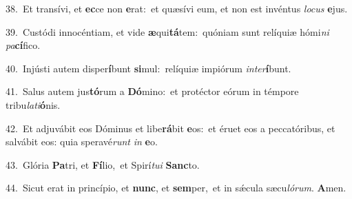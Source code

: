 {\numbfont\textcolor{\numbcolor}{38.}}~Et transívi, et \textbf{ec}\-ce non \textbf{e}\-rat:~\star et quæsívi eum, et non est invéntus \textit{lo}\-\textit{cus} \textbf{e}\-jus.\par
{\numbfont\textcolor{\numbcolor}{39.}}~Custódi innocéntiam, et vide \textbf{æ}\-qui\-\textbf{tá}\-tem:~\star quóniam sunt relíquiæ hómi\textit{ni} \textit{pa}\-\textbf{cí}fico.\par
{\numbfont\textcolor{\numbcolor}{40.}}~Injústi autem disper\-\textbf{í}\-bunt \textbf{si}\-mul:~\star relíquiæ impiórum \textit{in}\-\textit{ter}\textbf{í}bunt.\par
{\numbfont\textcolor{\numbcolor}{41.}}~Salus autem jus\-\textbf{tó}\-rum a \textbf{Dó}\-mino:~\star et protéctor eórum in témpore tribu\-\textit{la}\-\textit{ti}\textbf{ó}nis.\par
{\numbfont\textcolor{\numbcolor}{42.}}~Et adjuvábit eos Dóminus et libe\-\textbf{rá}\-bit \textbf{e}\-os:~\star et éruet eos a peccatóribus, et salvábit eos: quia speravé\textit{runt} \textit{in} \textbf{e}\-o.\par
{\numbfont\textcolor{\numbcolor}{43.}}~Glória \textbf{Pa}\-tri, et \textbf{Fí}\-lio,~\star et Spirí\-\textit{tu}\-\textit{i} \textbf{Sanc}\-to.\par
{\numbfont\textcolor{\numbcolor}{44.}}~Sicut erat in princípio, et \textbf{nunc}\-, et \textbf{sem}\-per,~\star et in sǽcula sæcu\-\textit{ló}\-\textit{rum}. \textbf{A}\-men.\par
